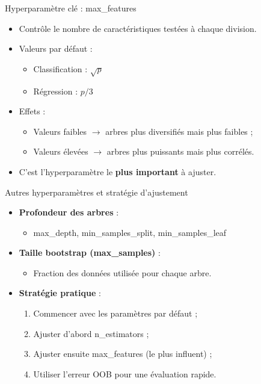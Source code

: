 \documentclass[11pt]{beamer}
\begin{document}
\begin{frame}{Hyperparamètre clé : max\_features}
\begin{itemize}
    \item Contrôle le nombre de caractéristiques testées à chaque division.
    \item Valeurs par défaut :
    \begin{itemize}
        \item Classification : $\sqrt{p}$
        \item Régression : $p/3$
    \end{itemize}
    \item Effets :
    \begin{itemize}
        \item Valeurs faibles $\rightarrow$ arbres plus diversifiés mais plus faibles ;
        \item Valeurs élevées $\rightarrow$ arbres plus puissants mais plus corrélés.
    \end{itemize}
    \item C'est l'hyperparamètre le \textbf{plus important} à ajuster.
\end{itemize}
\end{frame}

\begin{frame}{Autres hyperparamètres et stratégie d'ajustement}
\begin{itemize}
    \item \textbf{Profondeur des arbres} :
    \begin{itemize}
        \item max\_depth, min\_samples\_split, min\_samples\_leaf
    \end{itemize}
    
    \medskip
    \item \textbf{Taille bootstrap (max\_samples)} :
    \begin{itemize}
        \item Fraction des données utilisée pour chaque arbre.
    \end{itemize}
    
    \medskip
    \item \textbf{Stratégie pratique} :
    \begin{enumerate}
        \item Commencer avec les paramètres par défaut ;
        \item Ajuster d'abord n\_estimators ;
        \item Ajuster ensuite max\_features (le plus influent) ;
        \item Utiliser l'erreur OOB pour une évaluation rapide.
    \end{enumerate}
\end{itemize}
\end{frame}
\end{document}

